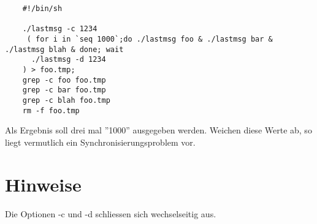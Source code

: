 \begin{verbatim}
	#!/bin/sh

	./lastmsg -c 1234
	 ( for i in `seq 1000`;do ./lastmsg foo & ./lastmsg bar & ./lastmsg blah & done; wait
	  ./lastmsg -d 1234 
	) > foo.tmp;
	grep -c foo foo.tmp
	grep -c bar foo.tmp
	grep -c blah foo.tmp
	rm -f foo.tmp
\end{verbatim}

Als Ergebnis soll drei mal ''1000'' ausgegeben werden. Weichen diese Werte
ab, so liegt vermutlich ein Synchronisierungsproblem vor.

\section*{Hinweise}

Die Optionen -c und -d schliessen sich wechselseitig aus.

\osueguidelinesthree



